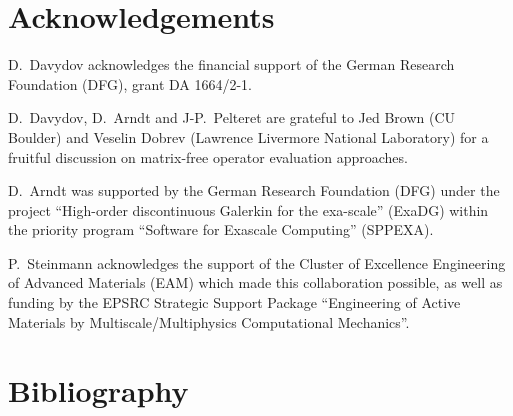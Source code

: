 \documentclass[preprint,12pt,times]{elsarticle}
\begin{document}
\section*{Acknowledgements}

D.~Davydov acknowledges the financial support of the German Research Foundation (DFG), grant DA 1664/2-1.

D.~Davydov, D.~Arndt and J-P.~Pelteret are grateful to Jed Brown (CU Boulder) and Veselin Dobrev (Lawrence Livermore National Laboratory) for a fruitful discussion on matrix-free operator evaluation approaches.

D.~Arndt was supported by the German Research Foundation (DFG) under the project ``High-order discontinuous
Galerkin for the exa-scale'' (\mbox{ExaDG}) within the priority program ``Software
for Exascale Computing'' (SPPEXA).


P.~Steinmann acknowledges the support of the Cluster of Excellence Engineering of Advanced Materials (EAM) which made this collaboration possible, as well as funding by the EPSRC Strategic Support Package ``Engineering of Active Materials by Multiscale/Multiphysics Computational Mechanics''.

\section*{Bibliography}



\end{document}
